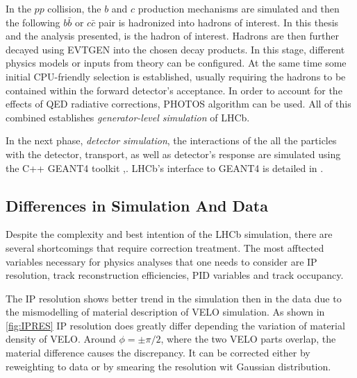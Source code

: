 In the $pp$ collision, the $b$ and $c$ production mechanisms are simulated and then the following $b\bar{b}$ or $c\bar{c}$ pair is hadronized into hadrons of interest. In this thesis and the analysis presented, \Bp is the hadron of interest. Hadrons are then further decayed using EVTGEN \cite{Lange:2001uf} into the chosen decay products. In this stage, different physics models or inputs from theory can be configured. At the same time some initial CPU-friendly selection is established, usually requiring the hadrons to be contained within the forward detector's acceptance.
In order to account for the effects of \Gls{QED} radiative corrections, PHOTOS \cite{photos} algorithm can be used. All of this combined establishes \textit{generator-level simulation} of LHCb.


In the next phase, \textit{detector simulation}, the interactions of the all the particles with the detector, transport, as well as detector's response are simulated using the C++ GEANT4 toolkit \cite{Geant4},\cite{Agostinelli:2002hh}. \Gls{LHCb}'s interface to GEANT4 is detailed in \cite{Clemencic:2011zza}. 

\subsection{Differences in Simulation And Data}
Despite the complexity and best intention of the \Gls{LHCb} simulation, there are several shortcomings that require correction treatment.
The most afftected variables necessary for physics analyses that one needs to consider are \Gls{IP} resolution, track reconstruction efficiencies, \Gls{PID} variables and track occupancy.

The \Gls{IP} resolution shows better trend in the simulation then in the data due to the mismodelling of material description of \Gls{VELO} simulation. As shown in \autoref{fig:IPRES} \Gls{IP} resolution does greatly differ depending the variation of material density of \Gls{VELO}. Around $\phi=\pm\pi/2$, where the two \Gls{VELO} parts overlap, the material difference causes the discrepancy. It can be corrected either by reweighting to data or by smearing the resolution wit Gaussian distribution.

